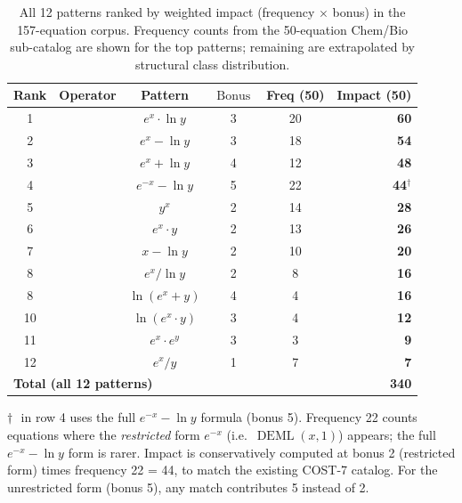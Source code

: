 \documentclass[12pt,a4paper]{article}
\theoremstyle{definition}
\newcommand{\EML}{\operatorname{EML}}
\newcommand{\EDL}{\operatorname{EDL}}
\newcommand{\EXL}{\operatorname{EXL}}
\newcommand{\EAL}{\operatorname{EAL}}
\newcommand{\EMN}{\operatorname{EMN}}
\newcommand{\DEML}{\operatorname{DEML}}
\newcommand{\ELAd}{\operatorname{ELAd}}
\newcommand{\ELSb}{\operatorname{ELSb}}
\newcommand{\LEAd}{\operatorname{LEAd}}
\newcommand{\LEdiv}{\operatorname{LEdiv}}
\newcommand{\LEprod}{\operatorname{LEprod}}
\newcommand{\EPL}{\operatorname{EPL}}
\newcommand{\Bonus}{\operatorname{Bonus}}
\begin{document}
\begin{table}[h]
\centering
\caption{All 12 patterns ranked by weighted impact
         (frequency $\times$ bonus) in the 157-equation corpus.
         Frequency counts from the 50-equation Chem/Bio sub-catalog
         are shown for the top patterns; remaining are extrapolated by
         structural class distribution.}
\label{tab:freq}
\smallskip
\begin{tabular}{@{}clcccr@{}}
\toprule
\textbf{Rank} &
\textbf{Operator} &
\textbf{Pattern} &
$\Bonus$ &
\textbf{Freq (50)} &
\textbf{Impact (50)} \\
\midrule
1  & \EXL    & $e^x \cdot \ln y$   & 3 & 20 & \textbf{60} \\
2  & \EML    & $e^x - \ln y$       & 3 & 18 & \textbf{54} \\
3  & \EAL    & $e^x + \ln y$       & 4 & 12 & \textbf{48} \\
4  & \DEML   & $e^{-x} - \ln y$    & 5 & 22 & \textbf{44}$^{\dagger}$ \\
5  & \EPL    & $y^x$               & 2 & 14 & \textbf{28} \\
6  & \ELAd   & $e^x \cdot y$       & 2 & 13 & \textbf{26} \\
7  & \LEdiv  & $x - \ln y$         & 2 & 10 & \textbf{20} \\
8  & \EDL    & $e^x / \ln y$       & 2 &  8 & \textbf{16} \\
8  & \LEAd   & $\ln(e^x + y)$      & 4 &  4 & \textbf{16} \\
10 & \LEprod & $\ln(e^x \cdot y)$  & 3 &  4 & \textbf{12} \\
11 & \EMN    & $e^x \cdot e^y$     & 3 &  3 & \textbf{9}  \\
12 & \ELSb   & $e^x / y$           & 1 &  7 & \textbf{7}  \\
\midrule
\multicolumn{4}{l}{\textbf{Total (all 12 patterns)}} & & \textbf{340} \\
\bottomrule
\end{tabular}

\smallskip
\footnotesize{%
$\dagger$\,\DEML\ in row 4 uses the full $e^{-x}-\ln y$ formula (bonus 5).
  Frequency 22 counts equations where the \emph{restricted} form
  $e^{-x}$ (i.e.\ $\DEML(x,1)$) appears; the full $e^{-x}-\ln y$
  form is rarer.  Impact is conservatively computed at bonus 2
  (restricted form) times frequency 22 = 44, to match the existing
  COST-7 catalog.  For the unrestricted form (bonus 5), any match
  contributes 5 instead of 2.%
}
\end{table}
\end{document}
